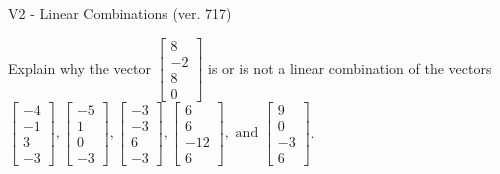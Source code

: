 \begin{exercise}
  \begin{exerciseTitle}V2 - Linear Combinations (ver. 717)\end{exerciseTitle}
  \begin{exerciseStatement}
    Explain why the vector \(\left[\begin{array}{c}
8 \\
-2 \\
8 \\
0
\end{array}\right]\)  is or is not a linear 
	combination of the vectors \(\left[\begin{array}{c}
-4 \\
-1 \\
3 \\
-3
\end{array}\right] , \left[\begin{array}{c}
-5 \\
1 \\
0 \\
-3
\end{array}\right] , \left[\begin{array}{c}
-3 \\
-3 \\
6 \\
-3
\end{array}\right] , \left[\begin{array}{c}
6 \\
6 \\
-12 \\
6
\end{array}\right] , \text{ and } \left[\begin{array}{c}
9 \\
0 \\
-3 \\
6
\end{array}\right]\).
	



\end{exerciseStatement}
\end{exercise}
